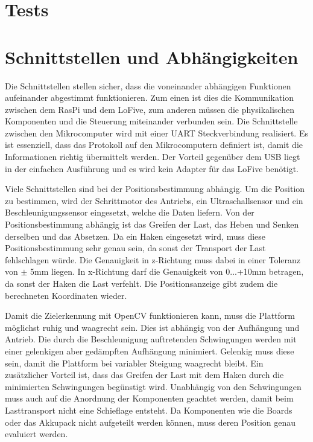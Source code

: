 \documentclass[a4paper]{report}
\begin{document}
\section{Tests}
\label{sec:TestsPrototyp}

\section{Schnittstellen und Abhängigkeiten}
\label{sec:SchnittAbhang}

Die Schnittstellen stellen sicher, dass die voneinander abhängigen Funktionen aufeinander abgestimmt funktionieren. Zum einen ist dies die Kommunikation zwischen dem RasPi und dem LoFive, zum anderen müssen die physikalischen Komponenten und die Steuerung miteinander verbunden sein. Die Schnittstelle zwischen den Mikrocomputer wird mit einer UART Steckverbindung realisiert. Es ist essenziell, dass das Protokoll auf den Mikrocomputern definiert ist, damit die Informationen richtig übermittelt werden. Der Vorteil gegenüber dem USB liegt in der einfachen Ausführung und es wird kein Adapter für das LoFive benötigt.

Viele Schnittstellen sind bei der Positionsbestimmung abhängig. Um die Position zu bestimmen, wird der Schrittmotor des Antriebs, ein Ultraschallsensor und ein Beschleunigungssensor eingesetzt, welche die Daten liefern. Von der Positionsbestimmung abhängig ist das Greifen der Last, das Heben und Senken derselben und das Absetzen. Da ein Haken eingesetzt wird, muss diese Positionsbestimmung sehr genau sein, da sonst der Transport der Last fehlschlagen würde. Die Genauigkeit in z-Richtung muss dabei in einer Toleranz von $\pm$ 5mm liegen. In x-Richtung darf die Genauigkeit von 0...+10mm betragen, da sonst der Haken die Last verfehlt. Die Positionsanzeige gibt zudem die berechneten Koordinaten wieder.

Damit die Zielerkennung mit OpenCV funktionieren kann, muss die Plattform möglichst ruhig und waagrecht sein. Dies ist abhängig von der Aufhängung und Antrieb. Die durch die Beschleunigung auftretenden Schwingungen werden mit einer gelenkigen aber gedämpften Aufhängung minimiert. Gelenkig muss diese sein, damit die Plattform bei variabler Steigung waagrecht bleibt. Ein zusätzlicher Vorteil ist, dass das Greifen der Last mit dem Haken durch die minimierten Schwingungen begünstigt wird. Unabhängig von den Schwingungen muss auch auf die Anordnung der Komponenten geachtet werden, damit beim Lasttransport nicht eine Schieflage entsteht. Da Komponenten wie die Boards oder das Akkupack nicht aufgeteilt werden können, muss deren Position genau evaluiert werden.
\end{document}
